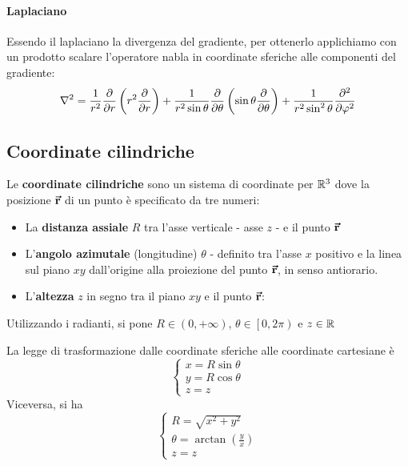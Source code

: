 \paragraph{Laplaciano}
Essendo il laplaciano la divergenza del gradiente, per ottenerlo applichiamo con un prodotto scalare l'operatore nabla in coordinate sferiche alle componenti del gradiente:
\begin{equation}
	\laplacian=\frac{1}{r^2}\pdv{r}\left(r^2\pdv{r}\right)+\frac{1}{r^2\sin\theta}\pdv{\theta}\left(\sin\theta\pdv{\theta}\right)+\frac{1}{r^2\sin^2\theta}\pdv[2]{\phi}
\end{equation}
\subsection{Coordinate cilindriche}
\begin{define}
	Le \textbf{coordinate cilindriche} sono un sistema di coordinate per $\mathbb{R}^3$ dove la posizione $\vb*{\va{r}}$ di un punto è specificato da tre numeri:
	\begin{itemize}
		\item La \textbf{distanza assiale} $R$ tra l'asse verticale - asse $z$ - e il punto $\vb*{\va{r}}$
		\item L'\textbf{angolo azimutale} (longitudine) $\theta$ - definito tra l'asse $x$ positivo e la linea sul piano $xy$ dall'origine alla proiezione del punto $\vb*{\va{r}}$, in senso antiorario.
		\item L'\textbf{altezza} $z$ in segno tra il piano $xy$ e il punto $\vb*{\va{r}}$:
	\end{itemize}
	Utilizzando i radianti, si pone $R\in\left(0,+\infty\right)$, $\theta\in\left[0,2\pi\right)$ e $z\in\mathbb{R}$
\end{define}
La legge di trasformazione dalle coordinate sferiche alle coordinate cartesiane è
\begin{equation}
	\begin{cases}
		x=R\sin\theta\\
		y=R\cos\theta\\
		z=z
	\end{cases}
\end{equation}
Viceversa, si ha
\begin{equation}
	\begin{cases}
		R=\sqrt{x^2+y^2}\\
		\theta=\arctan\left(\frac{y}{x}\right)\\
		z=z
	\end{cases}	
\end{equation}
